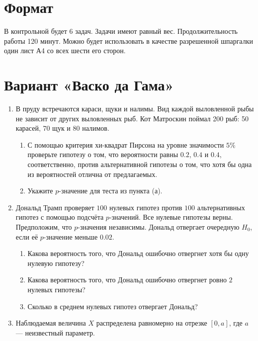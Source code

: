 \documentclass[12pt]{article}
\begin{document}
\section*{Формат}

В контрольной будет 6 задач.
Задачи имеют равный вес. 
Продолжительность работы 120 минут. 
Можно будет использовать в качестве разрешенной шпаргалки один лист А4 со всех шести его сторон.



\section*{Вариант «Васко да Гама»}
\begin{enumerate}
    \item В пруду встречаются караси, щуки и налимы. 
    Вид каждой выловленной рыбы не зависит от других выловленных рыб.
    Кот Матроскин поймал 200 рыб: 50 карасей, 70 щук и 80 налимов. 

    \begin{enumerate}
        \item С помощью критерия хи-квадрат Пирсона на уровне значимости $5\%$ проверьте гипотезу о том, что вероятности равны $0.2$, $0.4$ и $0.4$, 
        соответственно, против альтернативной гипотезы о том, что хотя бы одна из вероятностей отлична от предлагаемых.
        \item Укажите $p$-значение для теста из пункта (а).
    \end{enumerate}
    
    \item Дональд Трамп проверяет $100$ нулевых гипотез против $100$ альтернативных гипотез с помощью подсчёта $p$-значений.
    Все нулевые гипотезы верны. 
    Предположим, что $p$-значения независимы. 
    Дональд отвергает очередную $H_0$, если её $p$-значение меньше $0.02$.

    \begin{enumerate}
        \item Какова вероятность того, что Дональд ошибочно отвергнет хотя бы одну нулевую гипотезу?
        \item Какова вероятность того, что Дональд ошибочно отвергнет ровно $2$ нулевых гипотезы?
        \item Сколько в среднем нулевых гипотез отвергает Дональд?
    \end{enumerate}
    
    
    \item Наблюдаемая величина $X$ распределена равномерно на отрезке $[0, a]$, где $a$ — неизвестный параметр.
    

\end{enumerate}
\end{document}
